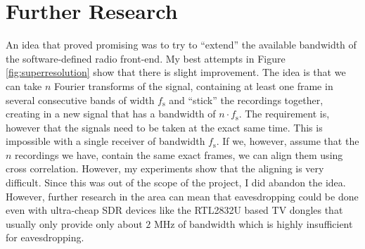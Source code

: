 \documentclass[a4paper,12pt,twoside,openright]{report}
\begin{document}
\section{Further Research}

An idea that proved promising was to try to ``extend'' the available bandwidth of the software-defined radio front-end. My best attempts in Figure \ref{fig:superresolution} show that there is slight improvement. The idea is that we can take $n$ Fourier transforms of the signal, containing at least one frame in several consecutive bands of width $f_\text{s}$ and ``stick'' the recordings together, creating in a new signal that has a bandwidth of $n \cdot f_\text{s}$. The requirement is, however that the signals need to be taken at the exact same time. This is impossible with a single receiver of bandwidth $f_\text{s}$. If we, however, assume that the $n$ recordings we have, contain the same exact frames, we can align them using cross correlation. However, my experiments show that the aligning is very difficult. Since this was out of the scope of the project, I did abandon the idea. However, further research in the area can mean that eavesdropping could be done even with ultra-cheap SDR devices like the RTL2832U based TV dongles that usually only provide only about $2$ MHz of bandwidth which is highly insufficient for eavesdropping.
\end{document}
